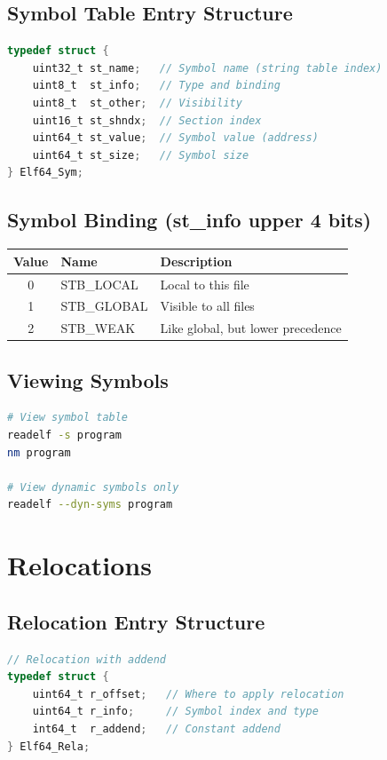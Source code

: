 \subsection{Symbol Table Entry Structure}

\begin{lstlisting}[language=C]
typedef struct {
    uint32_t st_name;   // Symbol name (string table index)
    uint8_t  st_info;   // Type and binding
    uint8_t  st_other;  // Visibility
    uint16_t st_shndx;  // Section index
    uint64_t st_value;  // Symbol value (address)
    uint64_t st_size;   // Symbol size
} Elf64_Sym;
\end{lstlisting}

\subsection{Symbol Binding (st\_info upper 4 bits)}

\begin{tabular}{|c|l|l|}
\hline
\textbf{Value} & \textbf{Name} & \textbf{Description} \\
\hline
0 & STB\_LOCAL & Local to this file \\
\hline
1 & STB\_GLOBAL & Visible to all files \\
\hline
2 & STB\_WEAK & Like global, but lower precedence \\
\hline
\end{tabular}

\subsection{Viewing Symbols}

\begin{lstlisting}[language=bash]
# View symbol table
readelf -s program
nm program

# View dynamic symbols only
readelf --dyn-syms program
\end{lstlisting}

\section{Relocations}

\subsection{Relocation Entry Structure}

\begin{lstlisting}[language=C]
// Relocation with addend
typedef struct {
    uint64_t r_offset;   // Where to apply relocation
    uint64_t r_info;     // Symbol index and type
    int64_t  r_addend;   // Constant addend
} Elf64_Rela;
\end{lstlisting}

